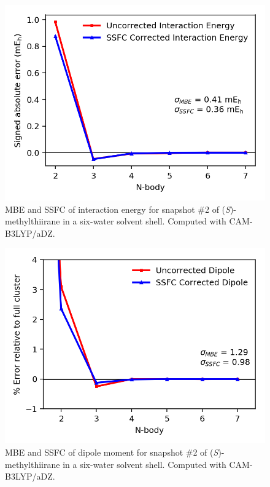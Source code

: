     \begin{figure}
        \centering
        \includegraphics[scale=0.75]{p1/graphs/si/metthi2_6_int.png}
        \caption{MBE and SSFC of interaction energy for snapshot
          \#2 of (\textit{S})-methylthiirane in a six-water solvent shell. Computed with CAM-B3LYP/aDZ.}
        \label{metthi2_6_int}
    \end{figure}
    \begin{figure}
        \centering
        \includegraphics[scale=0.75]{p1/graphs/si/metthi2_6_dip.png}
        \caption{MBE and SSFC of dipole moment for snapshot \#2 of (\textit{S})-methylthiirane in a six-water solvent shell. Computed with CAM-B3LYP/aDZ.}
        \label{metthi2_6_dip}
      \end{figure}

